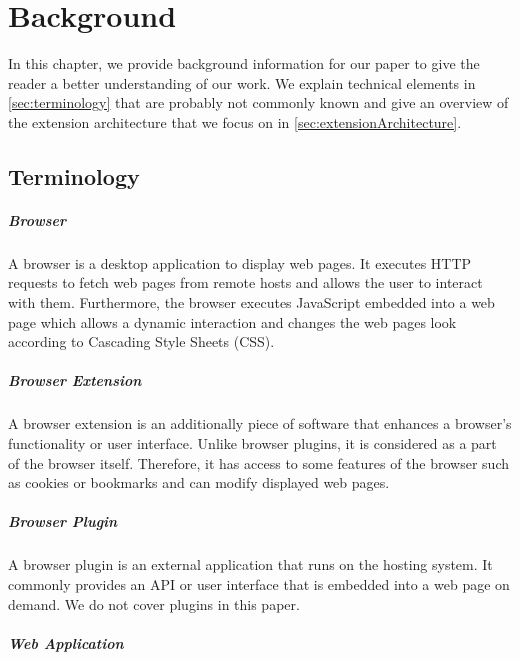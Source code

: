 
\chapter{Background}
\label{chp:background}

	In this chapter, we provide background information for our paper to give the reader a better understanding of our work. We explain technical elements in \autoref{sec:terminology} that are probably not commonly known and give an overview of the extension architecture that we focus on in \autoref{sec:extensionArchitecture}.

\section{Terminology}
\label{sec:terminology}

\paragraph{Browser}

	A browser is a desktop application to display web pages. It executes HTTP requests to fetch web pages from remote hosts and allows the user to interact with them. Furthermore, the browser executes JavaScript embedded into a web page which allows a dynamic interaction and changes the web pages look according to Cascading Style Sheets (CSS).
	
\paragraph{Browser Extension}
	
	A browser extension is an additionally piece of software that enhances a browser's functionality or user interface. Unlike browser plugins, it is considered as a part of the browser itself. Therefore, it has access to some features of the browser such as cookies or bookmarks and can modify displayed web pages. 
	
\paragraph{Browser Plugin}

	A browser plugin is an external application that runs on the hosting system. It commonly provides an API or user interface that is embedded into a web page on demand. We do not cover plugins in this paper.

\paragraph{Web Application}

